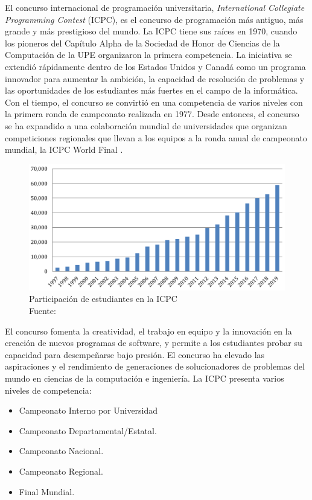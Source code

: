 El concurso internacional de programación universitaria, \textit{International Collegiate Programming Contest} (ICPC), es el concurso de programación más antiguo, más grande y más prestigioso del mundo. La ICPC tiene sus raíces en 1970, cuando los pioneros del Capítulo Alpha de la Sociedad de Honor de Ciencias de la Computación de la UPE organizaron la primera competencia. La iniciativa se extendió rápidamente dentro de los Estados Unidos y Canadá como un programa innovador para aumentar la ambición, la capacidad de resolución de problemas y las oportunidades de los estudiantes más fuertes en el campo de la informática. Con el tiempo, el concurso se convirtió en una competencia de varios niveles con la primera ronda de campeonato realizada en 1977. Desde entonces, el concurso se ha expandido a una colaboración mundial de universidades que organizan competiciones regionales que llevan a los equipos a la ronda anual de campeonato mundial, la ICPC World Final \citep{icpc-glogal}.

\begin{figure}[H]
    \centering
    \includegraphics[scale=0.7]{imagenes/ICPC_student_participation.png}
    \caption{Participación de estudiantes en la ICPC\\ Fuente: \citep{icpc-glogal}}
\end{figure}

El concurso fomenta la creatividad, el trabajo en equipo y la innovación en la creación de nuevos programas de software, y permite a los estudiantes probar su capacidad para desempeñarse bajo presión. El concurso ha elevado las aspiraciones y el rendimiento de generaciones de solucionadores de problemas del mundo en ciencias de la computación e ingeniería. La ICPC presenta varios niveles de competencia:  

\begin{itemize}
    \item Campeonato Interno por Universidad
    \item Campeonato Departamental/Estatal. 
    \item Campeonato Nacional. 
    \item Campeonato Regional.
    \item Final Mundial. 
\end{itemize}

